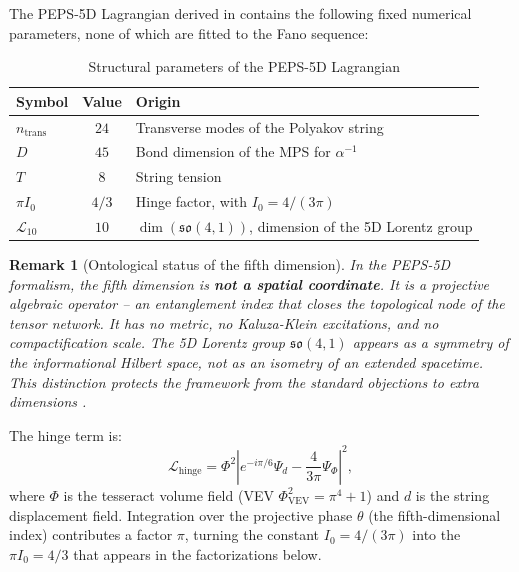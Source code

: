 \documentclass[12pt]{article}
\newtheorem{remark}{Remark}
\begin{document}
The PEPS-5D Lagrangian derived in \cite{peps5d} contains the following
fixed numerical parameters, none of which are fitted to the Fano sequence:

\begin{table}[h]
\centering
\caption{Structural parameters of the PEPS-5D Lagrangian}
\label{tab:params}
\begin{tabular}{lcl}
\toprule
\textbf{Symbol} & \textbf{Value} & \textbf{Origin} \\
\midrule
$n_{\text{trans}}$ & $24$ & Transverse modes of the Polyakov string \cite{alpha_series} \\
$D$ & $45$ & Bond dimension of the MPS for $\alpha^{-1}$ \cite{alpha_series} \\
$T$ & $8$ & String tension \cite{alpha_series} \\
$\pi I_0$ & $4/3$ & Hinge factor, with $I_0 = 4/(3\pi)$ \cite{peps5d} \\
$\mathcal{L}_{10}$ & $10$ & $\dim(\mathfrak{so}(4,1))$, dimension of the 5D Lorentz group \cite{peps5d} \\
\bottomrule
\end{tabular}
\end{table}

\begin{remark}[Ontological status of the fifth dimension]
In the PEPS-5D formalism, the fifth dimension is \textbf{not a spatial coordinate}.
It is a projective algebraic operator -- an entanglement index that closes the
topological node of the tensor network. It has no metric, no Kaluza-Klein
excitations, and no compactification scale. The 5D Lorentz group
$\mathfrak{so}(4,1)$ appears as a symmetry of the informational Hilbert space,
not as an isometry of an extended spacetime. This distinction protects the
framework from the standard objections to extra dimensions \cite{peps5d}.
\end{remark}

\noindent
The hinge term is:
\begin{equation}
\mathcal{L}_{\text{hinge}} = \Phi^2 \left| e^{-i\pi/6} \Psi_d - \frac{4}{3\pi} \Psi_{\Phi} \right|^2 ,
\label{eq:hinge}
\end{equation}
where $\Phi$ is the tesseract volume field (VEV $\Phi_{\text{VEV}}^2 = \pi^4 + 1$)
and $d$ is the string displacement field. Integration over the projective phase
$\theta$ (the fifth-dimensional index) contributes a factor $\pi$, turning the
constant $I_0 = 4/(3\pi)$ into the $\pi I_0 = 4/3$ that appears in the
factorizations below.
\end{document}
